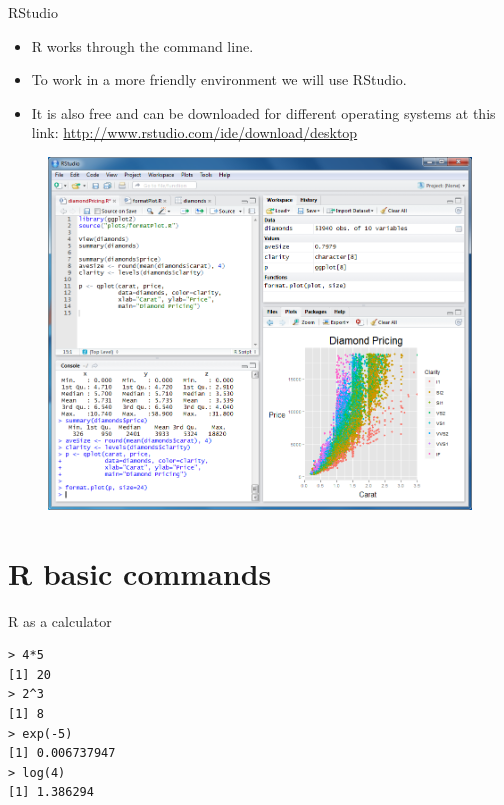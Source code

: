 \documentclass[handout]{beamer}
\begin{document}
\begin{frame}{RStudio}
\scriptsize{
\begin{itemize}
  \item R works through the command line.
 \item To work in a more friendly environment we will use RStudio.
 \item It is also free and can be downloaded for different operating systems at this link: \url{http://www.rstudio.com/ide/download/desktop}
\end{itemize}

} 

\begin{figure}[h!]
	\centering
	\includegraphics[scale=0.2]{pics/rstudio.png}
\end{figure}

 
\end{frame}


\section{R basic commands}

\begin{frame}[fragile]{R as a calculator}
\begin{verbatim}
> 4*5
[1] 20
> 2^3
[1] 8
> exp(-5)
[1] 0.006737947
> log(4)
[1] 1.386294
\end{verbatim}

 
\end{frame}
\end{document}
